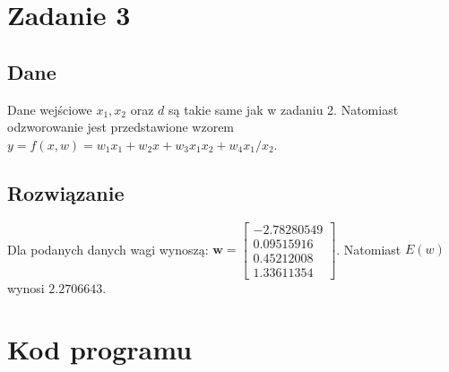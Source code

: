 \documentclass{article}
\begin{document}
\section{Zadanie 3}
\subsection{Dane}
Dane wejściowe $x_1, x_2$ oraz $d$ są takie same jak w zadaniu 2.
Natomiast odzworowanie jest przedstawione wzorem $y = f(x, w) = w_1x_1 + w_2x + w_3x_1x_2 + w_4x_1/x_2$.

\subsection{Rozwiązanie}

Dla podanych danych wagi wynoszą:
$
\textbf{w} = 
    \begin{bmatrix}
        -2.78280549 \\  0.09515916 \\  0.45212008 \\  1.33611354
    \end{bmatrix} 
$.
Natomiast $E(w)$ wynosi $2.2706643$.

\section{Kod programu}

\end{document}
